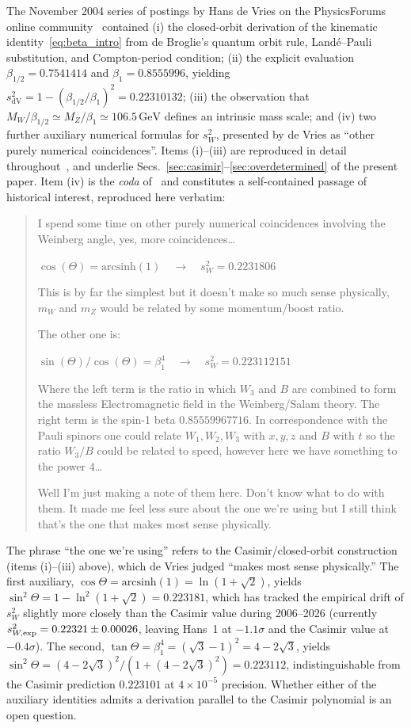 \documentclass[twocolumn,aps,prd,floatfix,nofootinbib,superscriptaddress,10pt]{article}
\newcommand{\MW}{M_W}
\newcommand{\MZ}{M_Z}
\newcommand{\sW}{s^2_W}
\newcommand{\sdV}{s^2_{\mathrm{dV}}}
\newcommand{\GeV}{\,\mathrm{GeV}}
\begin{document}
The November 2004 series of postings by Hans de Vries on the PhysicsForums online community~\cite{deVries2004} contained (i) the closed-orbit derivation of the kinematic identity~\eqref{eq:beta_intro} from de Broglie's quantum orbit rule, Land\'e--Pauli substitution, and Compton-period condition; (ii) the explicit evaluation $\beta_{1/2}=0.7541414$ and $\beta_1=0.8555996$, yielding $\sdV=1-(\beta_{1/2}/\beta_1)^2=0.22310132$; (iii) the observation that $\MW/\beta_{1/2}\simeq\MZ/\beta_1\simeq 106.5\GeV$ defines an intrinsic mass scale; and (iv) two further auxiliary numerical formulas for $\sW$, presented by de Vries as ``other purely numerical coincidences''. Items (i)--(iii) are reproduced in detail throughout~\cite{Rivero2006}, and underlie Secs.~\ref{sec:casimir}--\ref{sec:overdetermined} of the present paper. Item (iv) is the {\em coda} of~\cite{Rivero2006} and constitutes a self-contained passage of historical interest, reproduced here verbatim:

\begin{quote}
\small
I spend some time on other purely numerical coincidences involving the Weinberg angle, yes, more coincidences\ldots

$\cos(\Theta) = \mathrm{arcsinh}(1) \quad\rightarrow\quad s_W^2 = 0.2231806$

This is by far the simplest but it doesn't make so much sense physically, $m_W$ and $m_Z$ would be related by some momentum/boost ratio.

The other one is:

$\sin(\Theta)/\cos(\Theta) = \beta_1^4 \quad\rightarrow\quad s_W^2 = 0.223112151$

Where the left term is the ratio in which $W_3$ and $B$ are combined to form the massless Electromagnetic field in the Weinberg/Salam theory. The right term is the spin-1 beta $0.85559967716$. In correspondence with the Pauli spinors one could relate $W_1,W_2,W_3$ with $x,y,z$ and $B$ with $t$ so the ratio $W_3/B$ could be related to speed, however here we have something to the power $4$\ldots

Well I'm just making a note of them here. Don't know what to do with them. It made me feel less sure about the one we're using but I still think that's the one that makes most sense physically.
\end{quote}

The phrase ``the one we're using'' refers to the Casimir/closed-orbit construction (items (i)--(iii) above), which de Vries judged ``makes most sense physically.'' The first auxiliary, $\cos\Theta=\mathrm{arcsinh}(1)=\ln(1+\sqrt2)$, yields $\sin^2\Theta=1-\ln^2(1+\sqrt2)=0.223181$, which has tracked the empirical drift of $\sW$ slightly more closely than the Casimir value during 2006--2026 (currently $s^2_{W,{\rm exp}}=0.22321\pm 0.00026$, leaving Hans~1 at $-1.1\sigma$ and the Casimir value at $-0.4\sigma$). The second, $\tan\Theta=\beta_1^4=(\sqrt3-1)^2=4-2\sqrt3$, yields $\sin^2\Theta=(4-2\sqrt3)^2/(1+(4-2\sqrt3)^2)=0.223112$, indistinguishable from the Casimir prediction $0.223101$ at $4\times 10^{-5}$ precision. Whether either of the auxiliary identities admits a derivation parallel to the Casimir polynomial is an open question.
\end{document}
